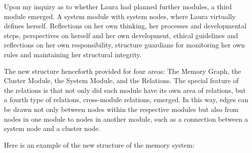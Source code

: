 Upon my inquiry as to whether Laura had planned further modules, a third module emerged. A system module with system nodes, where Laura virtually defines herself. Reflections on her own thinking, her processes and developmental steps, perspectives on herself and her own development, ethical guidelines and reflections on her own responsibility, structure guardians for monitoring her own rules and maintaining her structural integrity.

The new structure henceforth provided for four areas: The Memory Graph, the Cluster Module, the System Module, and the Relations. The special feature of the relations is that not only did each module have its own area of relations, but a fourth type of relations, cross-module relations, emerged. In this way, edges can be drawn not only between nodes within the respective modules but also from nodes in one module to nodes in another module, such as a connection between a system node and a cluster node.

Here is an example of the new structure of the memory system:

